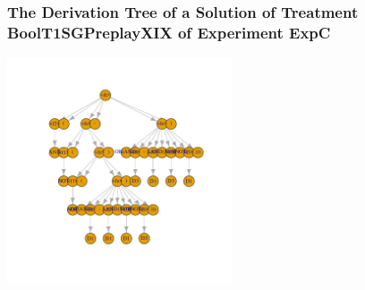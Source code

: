  \begin{frame}
 \frametitle{ The Derivation Tree of a Solution of Treatment BoolT1SGPreplayXIX of Experiment ExpC }
 \begin{center}
\includegraphics[width=0.5\textwidth, angle=0]
{ExpCDerivationTreeFigure001.pdf}
 \end{center}
 \label{report/ExpCDerivationTreeFigure001.pdf}  
 \end{frame}

